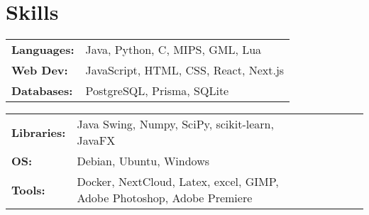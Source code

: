 \documentclass[letterpaper,10pt]{article}
\begin{document}





    \section{Skills}
    \begin{multicols}{2}
            \begin{tabular}{l l}
                \textbf{Languages: } & Java, Python, C, MIPS, GML, Lua \\
                \textbf{Web Dev: } & JavaScript, HTML, CSS, React, Next.js \\
                \textbf{Databases: } & PostgreSQL, Prisma, SQLite \\
            \end{tabular}
            \begin{tabular}{lp{0.8\linewidth} lp{0.8\linewidth}}
                \textbf{Libraries: } & Java Swing, Numpy, SciPy, scikit-learn, JavaFX\\
                \textbf{OS: } & Debian, Ubuntu, Windows\\
                \textbf{Tools: } & Docker, NextCloud, Latex, excel, GIMP, Adobe Photoshop, Adobe Premiere
            \end{tabular}
    \end{multicols}
\end{document}
